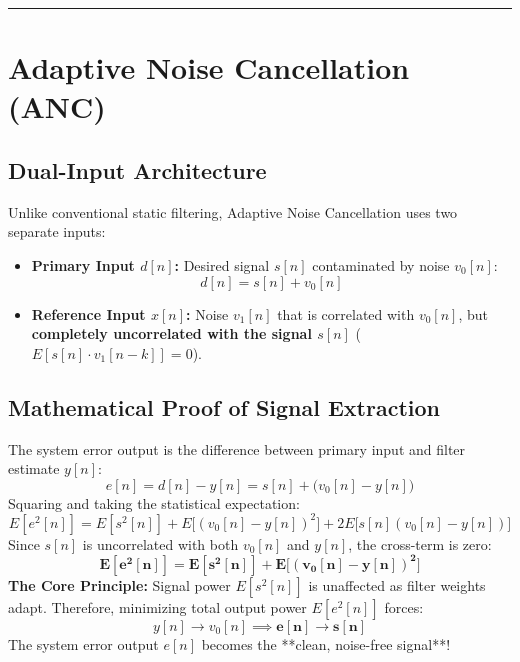 \documentclass[11pt,a4paper]{article}
\begin{document}
\noindent\rule{\textwidth}{0.5pt}

\section{Adaptive Noise Cancellation (ANC)}

\subsection{Dual-Input Architecture}
Unlike conventional static filtering, Adaptive Noise Cancellation uses two separate inputs:
\begin{itemize}
    \item \textbf{Primary Input $d[n]$:} Desired signal $s[n]$ contaminated by noise $v_0[n]$:
    \begin{equation}
    d[n] = s[n] + v_0[n]
    \end{equation}
    \item \textbf{Reference Input $x[n]$:} Noise $v_1[n]$ that is correlated with $v_0[n]$, but \textbf{completely uncorrelated with the signal $s[n]$} ($E[s[n] \cdot v_1[n-k]] = 0$).
\end{itemize}

\subsection{Mathematical Proof of Signal Extraction}
The system error output is the difference between primary input and filter estimate $y[n]$:
\begin{equation}
e[n] = d[n] - y[n] = s[n] + \big(v_0[n] - y[n]\big)
\end{equation}
Squaring and taking the statistical expectation:
\begin{equation}
E[e^2[n]] = E[s^2[n]] + E\big[(v_0[n] - y[n])^2\big] + 2 E\big[s[n](v_0[n] - y[n])\big]
\end{equation}
Since $s[n]$ is uncorrelated with both $v_0[n]$ and $y[n]$, the cross-term is zero:
\begin{equation}
\mathbf{E[e^2[n]] = E[s^2[n]] + E\big[(v_0[n] - y[n])^2\big]}
\end{equation}
\textbf{The Core Principle:} Signal power $E[s^2[n]]$ is unaffected as filter weights adapt. Therefore, minimizing total output power $E[e^2[n]]$ forces:
\begin{equation}
y[n] \longrightarrow v_0[n] \implies \mathbf{e[n] \longrightarrow s[n]}
\end{equation}
The system error output $e[n]$ becomes the **clean, noise-free signal**!
\end{document}
